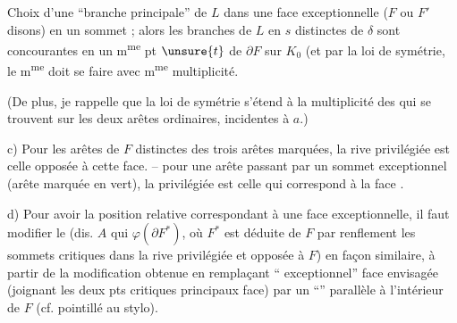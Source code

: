 {Choix d'une  ``branche principale'' \inserted{$\delta$} de $L$ dans une face exceptionnelle ($F$ ou $F'$ disons) en un sommet ; alors les branches de $L$ en $s$ distinctes de \deleted{$\unsure{\delta}$} $\delta$ sont concourantes en un m\textsuperscript{me} pt $\unsure{t}$ de $\partial F$ sur $K_0$ (et par la loi de symétrie, le m\textsuperscript{me} doit se faire avec m\textsuperscript{me} multiplicité.

(De plus, je rappelle que la loi de symétrie s'étend à la multiplicité des    qui se trouvent sur les deux arêtes ordinaires, incidentes à $a$.)

c) Pour les arêtes de $F$  distinctes des trois arêtes marquées,  la  rive privilégiée est celle opposée à cette face. -- pour une arête  passant par un sommet exceptionnel (arête marquée en vert), la  privilégiée est celle qui correspond à la face .

d) Pour avoir la position relative correspondant à une face exceptionnelle, il faut modifier le   (dis. $A$ qui  $\varphi(\partial F^*)$, où $F^*$ est déduite de $F$ par renflement  les sommets critiques dans la rive  privilégiée et opposée à $F$) en  façon similaire, à partir de la modification obtenue en remplaçant ``   exceptionnel''  face envisagée (joignant les deux pts critiques principaux  face) par un ``'' parallèle à l'intérieur de $F$ (cf. pointillé au stylo).
}
